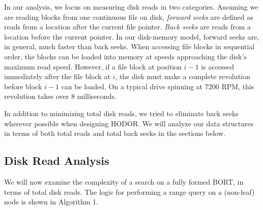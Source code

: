\documentclass[11pt, oneside]{article}
\begin{document}
In our analysis, we focus on measuring disk reads in two categories.  Assuming
we are reading blocks from one continuous file on disk, \textit{forward seeks}
are defined as reads from a location after the current file pointer.
\textit{Back seeks} are reads from a location before the current pointer. In our
disk-memory model, forward seeks are, in general, much faster than back seeks.
When accessing file blocks in sequential order, the blocks can be loaded into
memory at speeds approaching the disk's maximum read speed.  However, if a file
block at position $i-1$ is accessed immediately after the file block at $i$, the
disk must make a complete revolution before block $i-1$ can be loaded. On a
typical drive spinning at 7200 RPM, this revolution takes over 8 milliseconds.

In addition to minimizing total disk reads, we tried to eliminate back seeks
wherever possible when designing HODOR. We will analyze our data structures in
terms of both total reads and total back seeks in the sections below.

\subsection{Disk Read Analysis}

We will now examine the complexity of a search on a fully formed BORT, in terms
of total disk reads. The logic for performing a range query on a (non-leaf) node
is shown in Algorithm 1.
\end{document}
